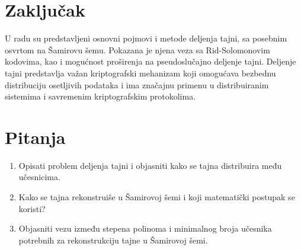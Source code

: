 \section{Zaključak}
U radu su predstavljeni osnovni pojmovi i metode deljenja tajni, sa posebnim osvrtom na Šamirovu šemu. Pokazana je njena veza sa Rid-Solomonovim kodovima, kao i mogućnost proširenja na pseudoslučajno deljenje tajni. Deljenje tajni predstavlja važan kriptografski mehanizam koji omogućava bezbednu distribuciju osetljivih podataka i ima značajnu primenu u distribuiranim sistemima i savremenim kriptografskim protokolima.
\section{Pitanja}

\begin{enumerate}
\item{
Opisati problem deljenja tajni i objasniti kako se tajna distribuira među učesnicima.
}
\item
{
Kako se tajna rekonstruiše u Šamirovoj šemi i koji matematički postupak se koristi?
}
\item
{
Objasniti vezu između stepena polinoma i minimalnog broja učesnika potrebnih za rekonstrukciju tajne u Šamirovoj šemi.
}
\end{enumerate}
